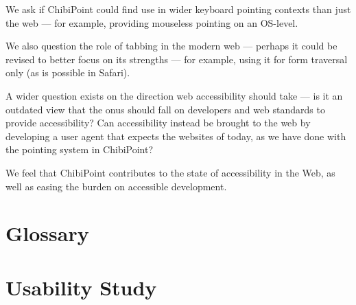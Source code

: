 \documentclass[11pt,openright,a4paper]{report}
\begin{document}
We ask if ChibiPoint could find use in wider keyboard pointing contexts than just the web --- for example, providing mouseless pointing on an OS-level.

We also question the role of tabbing in the modern web --- perhaps it could be revised to better focus on its strengths --- for example, using it for form traversal only (as is possible in Safari).

A wider question exists on the direction web accessibility should take --- is it an outdated view that the onus should fall on developers and web standards to provide accessibility? Can accessibility instead be brought to the web by developing a user agent that expects the websites of today, as we have done with the pointing system in ChibiPoint?

We feel that ChibiPoint contributes to the state of accessibility in the Web, as well as easing the burden on accessible development.

\pagebreak
\chapter{Glossary}
\printglossary

\clearpage


{}
\printbibliography

\clearpage
{}
{}
\appendix
\chapter{Usability Study}
\end{document}

